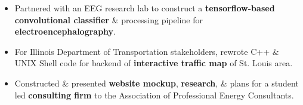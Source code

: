\documentclass[8pt,a4paper,ragged2e,withhyper]{altacv}
\begin{document}
\begin{paracol}{2}

\smallskip


\begin{itemize}
    \item Partnered with an EEG research lab to construct a \textbf{tensorflow-based convolutional classifier} \& processing pipeline for \textbf{electroencephalography}.
    
\end{itemize}
\divider

\begin{itemize}
\item For Illinois Department of Transportation stakeholders, rewrote C++ \& UNIX Shell code  for backend of \textbf{interactive traffic map} of St. Louis area.\end{itemize}
\divider

\begin{itemize}
\item Constructed \& presented \textbf{website mockup}, \textbf{research}, \& plans for a student led \textbf{consulting firm} to the Association of Professional Energy Consultants.%
\end{itemize}

\divider





\end{paracol}
\end{document}
